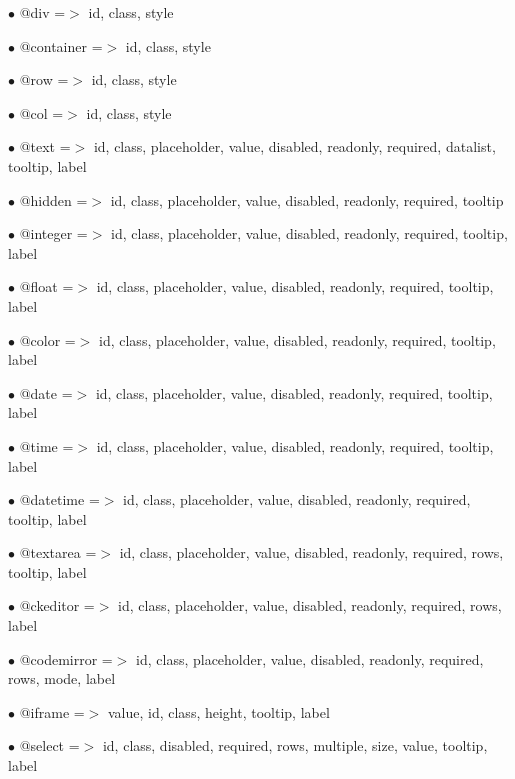 \documentclass[a4paper]{book}
\begin{document}
\begin{compactitem}
\item[\color{myblue}$\bullet$] @div         =$>$ id, class, style
\item[\color{myblue}$\bullet$] @container   =$>$ id, class, style
\item[\color{myblue}$\bullet$] @row         =$>$ id, class, style
\item[\color{myblue}$\bullet$] @col         =$>$ id, class, style
\item[\color{myblue}$\bullet$] @text        =$>$ id, class, placeholder, value, disabled, readonly, required, datalist, tooltip, label
\item[\color{myblue}$\bullet$] @hidden      =$>$ id, class, placeholder, value, disabled, readonly, required, tooltip
\item[\color{myblue}$\bullet$] @integer     =$>$ id, class, placeholder, value, disabled, readonly, required, tooltip, label
\item[\color{myblue}$\bullet$] @float       =$>$ id, class, placeholder, value, disabled, readonly, required, tooltip, label
\item[\color{myblue}$\bullet$] @color       =$>$ id, class, placeholder, value, disabled, readonly, required, tooltip, label
\item[\color{myblue}$\bullet$] @date        =$>$ id, class, placeholder, value, disabled, readonly, required, tooltip, label
\item[\color{myblue}$\bullet$] @time        =$>$ id, class, placeholder, value, disabled, readonly, required, tooltip, label
\item[\color{myblue}$\bullet$] @datetime    =$>$ id, class, placeholder, value, disabled, readonly, required, tooltip, label
\item[\color{myblue}$\bullet$] @textarea    =$>$ id, class, placeholder, value, disabled, readonly, required, rows, tooltip, label
\item[\color{myblue}$\bullet$] @ckeditor    =$>$ id, class, placeholder, value, disabled, readonly, required, rows, label
\item[\color{myblue}$\bullet$] @codemirror  =$>$ id, class, placeholder, value, disabled, readonly, required, rows, mode, label
\item[\color{myblue}$\bullet$] @iframe      =$>$ value, id, class, height, tooltip, label
\item[\color{myblue}$\bullet$] @select      =$>$ id, class, disabled, required, rows, multiple, size, value, tooltip, label

\end{compactitem}
\end{document}
